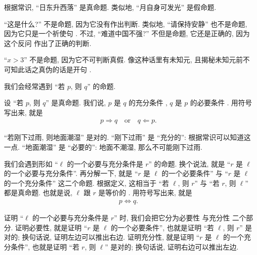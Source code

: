\begin{example}
    根据常识, ``日东升西落'' 是真命题. 类似地, ``月自身可发光'' 是假命题.

    ``这是什么?'' 不是命题, 因为它没有作出判断. 类似地, ``请保持安静'' 也不是命题, 因为它只是一个祈使句 . 不过, ``难道中国不强?'' 不但是命题, 它还是正确的, 因为这个反问  作出了正确的判断.

    ``$x > 3$'' 不是命题, 因为它不可判断真假. 像这种话里有未知元, 且揭秘未知元前不可知此话之真伪的话是开句 .
\end{example}

我们会经常遇到 ``若 $p$, 则 $q$'' 的命题.

\begin{definition}
    设 ``若 $p$, 则 $q$'' 是真命题. 我们说, $p$ 是 $q$ 的充分条件 , $q$ 是 $p$ 的必要条件 . 用符号写出来, 就是
    \begin{align*}
        p \Rightarrow q \quad \text{or} \quad q \Leftarrow p.
    \end{align*}
\end{definition}

\begin{example}
    ``若刚下过雨, 则地面潮湿'' 是对的. ``刚下过雨'' 是 ``充分的'': 根据常识可以知道这一点. ``地面潮湿'' 是 ``必要的'': 地面不潮湿, 那么不可能刚下过雨.
\end{example}

\begin{remark}
    我们会遇到形如 ``$\ell$ 的一个必要与充分条件是 $r$'' 的命题. 换个说法, 就是 ``$r$ 是 $\ell$ 的一个必要与充分条件''. 再分解一下, 就是 ``$r$ 是 $\ell$ 的一个必要条件'' 与 ``$r$ 是 $\ell$ 的一个充分条件'' 这二个命题. 根据定义, 这相当于 ``若 $\ell$, 则 $r$'' 与 ``若 $r$, 则 $\ell$'' 都是真命题. 也就是说, $\ell$ 跟 $r$ 是等价的 . 用符号写出来, 就是
    \begin{align*}
        p \Leftrightarrow q.
    \end{align*}

    证明 ``$\ell$ 的一个必要与充分条件是 $r$'' 时, 我们会把它分为必要性  与充分性  二个部分. 证明必要性, 就是证明 ``$r$ 是 $\ell$ 的一个必要条件'', 也就是证明 ``若 $\ell$, 则 $r$'' 是对的; 换句话说, 证明左边可以推出右边. 证明充分性, 就是证明 ``$r$ 是 $\ell$ 的一个充分条件'', 也就是证明 ``若 $r$, 则 $\ell$'' 是对的; 换句话说, 证明右边可以推出左边.
\end{remark}

